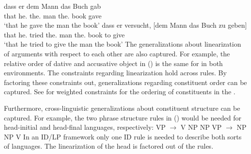 \documentclass[output=paper,biblatex,babelshorthands,newtxmath,draftmode,colorlinks,citecolor=brown]{langscibook}
\begin{document}
\eal
\ex 
\gll dass er dem Mann das Buch gab\\
     that he.\nom{} the.\dat{} man the.\acc{} book gave\\
\glt `that he gave the man the book'
\ex
\gll dass er versucht, [dem Mann das Buch zu geben]\\
     that he.\nom{} tried     \spacebr{}the.\dat{} man the.\acc{} book to give\\
\glt `that he tried to give the man the book'
\zl
The generalizations about linearization of arguments with respect to each other are also
captured. For example, the relative order of dative and accusative object in () is the same
for in both environments. The constraints regarding linearization hold across rules. By factoring these constraints out,
generalizations regarding constituent order can be captured. See \citet[Section~3.1]{Uszkoreit87a}
for weighted constraints for the ordering of constituents in the \mf.

Furthermore, cross-linguistic generalizations about constituent structure can be captured. For
example, the two phrase structure rules in () would be needed for head-initial and head-final
languages, respectively: 
\eal
\ex VP $\to$ V NP NP
\ex VP $\to$ NP NP V
\zl
In an ID/LP framework only one ID rule is needed to describe both sorts of languages. The
linearization of the head is factored out of the rules.
\end{document}
